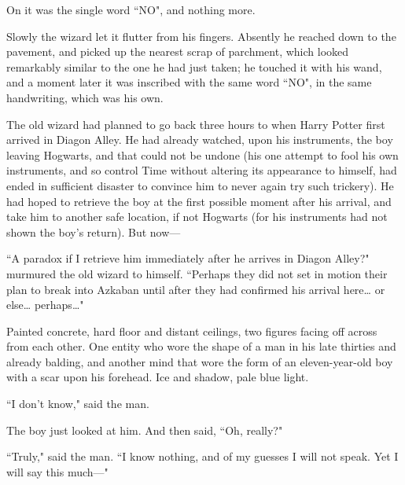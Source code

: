 On it was the single word ``NO", and nothing more.

Slowly the wizard let it flutter from his fingers. Absently he reached down to the pavement, and picked up the nearest scrap of parchment, which looked remarkably similar to the one he had just taken; he touched it with his wand, and a moment later it was inscribed with the same word ``NO", in the same handwriting, which was his own.

The old wizard had planned to go back three hours to when Harry Potter first arrived in Diagon Alley. He had already watched, upon his instruments, the boy leaving Hogwarts, and that could not be undone (his one attempt to fool his own instruments, and so control Time without altering its appearance to himself, had ended in sufficient disaster to convince him to never again try such trickery). He had hoped to retrieve the boy at the first possible moment after his arrival, and take him to another safe location, if not Hogwarts (for his instruments had not shown the boy's return). But now—

``A paradox if I retrieve him immediately after he arrives in Diagon Alley?" murmured the old wizard to himself. ``Perhaps they did not set in motion their plan to break into Azkaban until after they had confirmed his arrival here{\ldots} or else{\ldots} perhaps{\ldots}"

\later

Painted concrete, hard floor and distant ceilings, two figures facing off across from each other. One entity who wore the shape of a man in his late thirties and already balding, and another mind that wore the form of an eleven-year-old boy with a scar upon his forehead. Ice and shadow, pale blue light.

``I don't know," said the man.

The boy just looked at him. And then said, ``Oh, really?"

``Truly," said the man. ``I know nothing, and of my guesses I will not speak. Yet I will say this much—"

